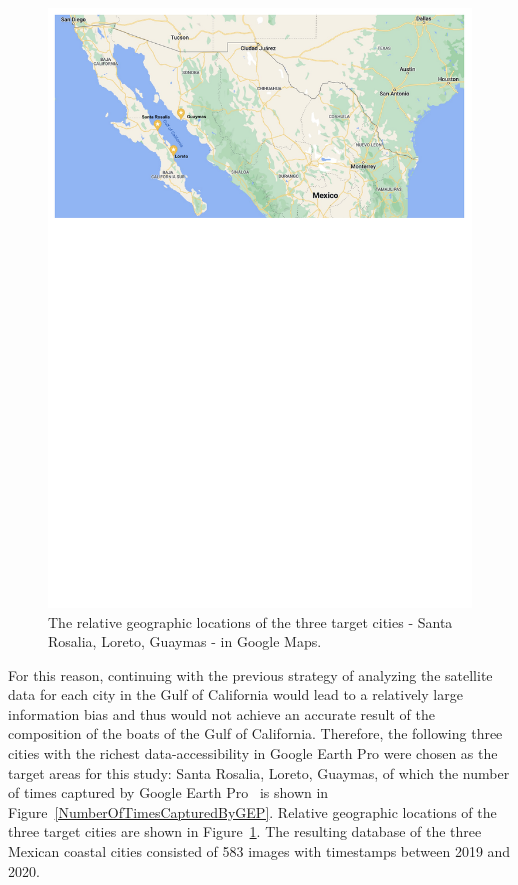 \begin{figure}[!t]
    \center
    \includegraphics[width=\columnwidth]{img/locations_maps.pdf}
    \caption{The relative geographic locations of the three target cities - Santa Rosalia, Loreto, Guaymas - in Google Maps.}
    \label{locations_maps}
\end{figure}


For this reason, continuing with the previous strategy of analyzing the satellite data for each city in the Gulf of California would lead to a relatively large information bias and thus would not achieve an accurate result of the composition of the boats of the Gulf of California. Therefore, the following three cities with the richest data-accessibility in Google Earth Pro were chosen as the target areas for this study: Santa Rosalia, Loreto, Guaymas, of which the number of times captured by Google Earth Pro~\cite{lisle2006google} is shown in Figure~\ref{NumberOfTimesCapturedByGEP}. Relative geographic locations of the three target cities are shown in Figure~\ref{locations_maps}. The resulting database of the three Mexican coastal cities consisted of 583 images with timestamps between 2019 and 2020.


